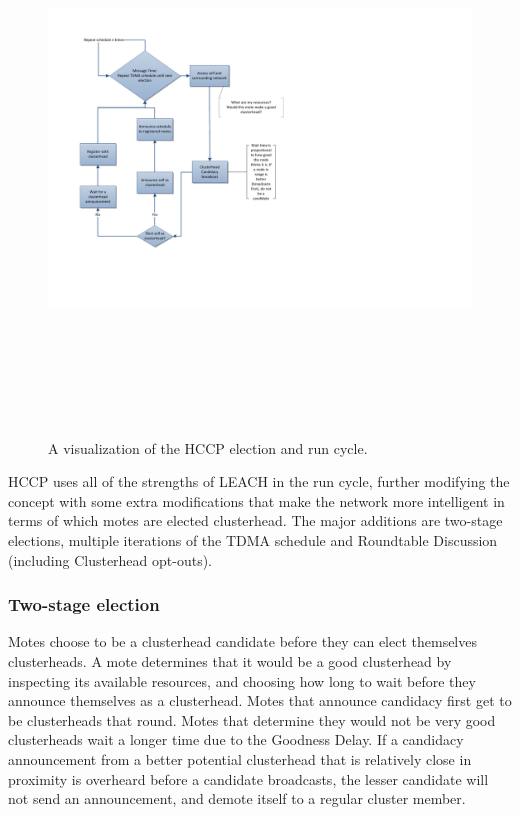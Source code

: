 \begin{figure}[ht]
	\centering
		\includegraphics[height=5.75in]{images/protocol/ElectionFlowchart.pdf}
	\caption{A visualization of the HCCP election and run cycle.}
	\label{fig:images_protocol_ElectionFlowchart}
\end{figure}

HCCP uses all of the strengths of LEACH in the run cycle, further modifying the 
concept with some extra modifications that make
the network more intelligent in terms of which motes are elected clusterhead. The major additions are two-stage elections,
multiple iterations of the TDMA schedule and Roundtable Discussion (including Clusterhead opt-outs).

\subsubsection* {Two-stage election}
	Motes choose to be a clusterhead candidate before they can elect themselves clusterheads. 
	A mote determines that it would be a good clusterhead by inspecting its available resources,
	and choosing how long to wait before they announce themselves as a clusterhead.
	Motes that announce candidacy first get to be clusterheads that round.
	Motes that determine they would not be 
	very good clusterheads wait a longer time due to the Goodness Delay. If a candidacy announcement 
	from a better potential clusterhead that is relatively close in proximity 
	is overheard before a candidate broadcasts, the lesser candidate will
	not send an announcement, and demote itself to a regular cluster member.
	
